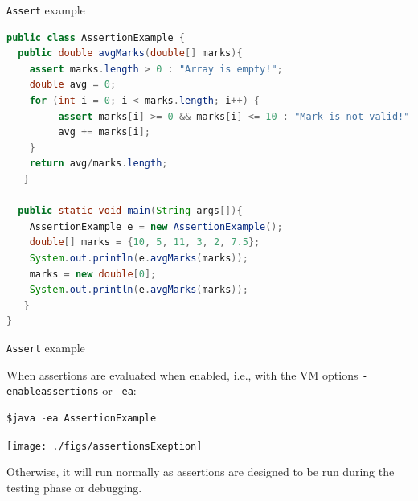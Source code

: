 \documentclass[11pt, xcolor=svgnames]{beamer}
\begin{document}

\begin{frame}[fragile]{\texttt{Assert} example}

\begin{lstlisting}[language=JAVA,basicstyle=\scriptsize]
public class AssertionExample {
  public double avgMarks(double[] marks){
   	assert marks.length > 0 : "Array is empty!";
   	double avg = 0;
   	for (int i = 0; i < marks.length; i++) {
   	     assert marks[i] >= 0 && marks[i] <= 10 : "Mark is not valid!";
   	     avg += marks[i];
   	}
   	return avg/marks.length;
   }

  public static void main(String args[]){
   	AssertionExample e = new AssertionExample();
   	double[] marks = {10, 5, 11, 3, 2, 7.5};
   	System.out.println(e.avgMarks(marks));
   	marks = new double[0];
   	System.out.println(e.avgMarks(marks));
   }
}
\end{lstlisting}


\end{frame}




\begin{frame}[fragile]{\texttt{Assert} example}

When assertions are evaluated when enabled, i.e., with the VM options \texttt{-enableassertions} or \texttt{-ea}:

\begin{lstlisting}[language=JAVA,basicstyle=\scriptsize]
$java -ea AssertionExample
\end{lstlisting}

\begin{center}
 \texttt{[image: ./figs/assertionsExeption]}
\end{center}


Otherwise, it will run normally as assertions are designed to be run during the testing phase or debugging.

\end{frame}

\end{document}
